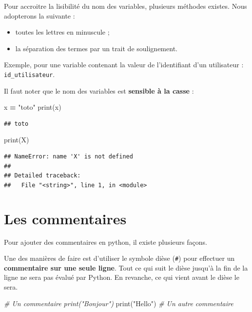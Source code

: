 \documentclass[12pt,]{book}
\newenvironment{Shaded}{\begin{snugshade}}{\end{snugshade}}
\newcommand{\StringTok}[1]{\textcolor[rgb]{0.31,0.60,0.02}{#1}}
\newcommand{\CommentTok}[1]{\textcolor[rgb]{0.56,0.35,0.01}{\textit{#1}}}
\newcommand{\OperatorTok}[1]{\textcolor[rgb]{0.81,0.36,0.00}{\textbf{#1}}}
\newcommand{\BuiltInTok}[1]{#1}
\newcommand{\NormalTok}[1]{#1}
\providecommand{\tightlist}{%
  \setlength{\itemsep}{0pt}\setlength{\parskip}{0pt}}
\numberwithin{equation}{section}
\numberwithin{countremarque}{section}
\begin{document}
Pour accroitre la lisibilité du nom des variables, plusieurs méthodes
existes. Nous adopterons la suivante :

\begin{itemize}
\tightlist
\item
  toutes les lettres en minuscule ;
\item
  la séparation des termes par un trait de soulignement.
\end{itemize}

Exemple, pour une variable contenant la valeur de l'identifiant d'un
utilisateur : \texttt{id\_utilisateur}.

Il faut noter que le nom des variables est \textbf{sensible à la casse}
:

\begin{Shaded}
\begin{Highlighting}[]
\NormalTok{x }\OperatorTok{=} \StringTok{"toto"}
\BuiltInTok{print}\NormalTok{(x)}
\end{Highlighting}
\end{Shaded}

\begin{lstlisting}
## toto
\end{lstlisting}

\begin{Shaded}
\begin{Highlighting}[]
\BuiltInTok{print}\NormalTok{(X)}
\end{Highlighting}
\end{Shaded}

\begin{lstlisting}
## NameError: name 'X' is not defined
## 
## Detailed traceback: 
##   File "<string>", line 1, in <module>
\end{lstlisting}

\section{Les commentaires}\label{les-commentaires}

Pour ajouter des commentaires en python, il existe plusieurs façons.

Une des manières de faire est d'utiliser le symbole dièse (\texttt{\#})
pour effectuer un \textbf{commentaire sur une seule ligne}. Tout ce qui
suit le dièse jusqu'à la fin de la ligne ne sera pas évalué par Python.
En revanche, ce qui vient avant le dièse le sera.

\begin{Shaded}
\begin{Highlighting}[]
\CommentTok{# Un commentaire print("Bonjour")}
\BuiltInTok{print}\NormalTok{(}\StringTok{"Hello"}\NormalTok{) }\CommentTok{# Un autre commentaire}
\end{Highlighting}
\end{Shaded}
\end{document}
